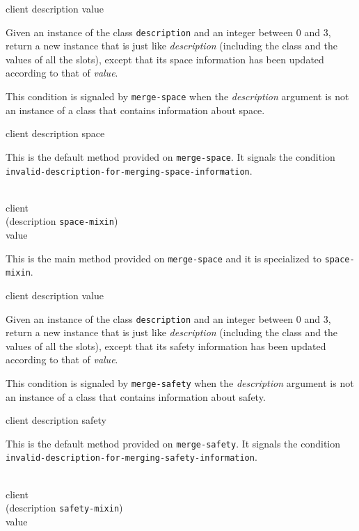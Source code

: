 {\footnotesize
{} {client description value}
}

Given an instance of the class \texttt{description} and an
integer between $0$ and $3$, return a new instance that is just like
\textit{description} (including the class and the values of
all the slots), except that its space information has been updated
according to that of \textit{value}.

{\footnotesize
{}
}

This condition is signaled by \texttt{merge-space} when the
\textit{description} argument is not an instance of a class that
contains information about space.

{\footnotesize
{} {client description space}
}

This is the default method provided on \texttt{merge-space}.  It
signals the condition
\texttt{invalid-description-for-merging-space-information}.

{\footnotesize
{}\\
           {client\\
            (description {\tt space-mixin})\\
            value}
}

This is the main method provided on \texttt{merge-space} and it is
specialized to \texttt{space-mixin}.

{\footnotesize
{} {client description value}
}

Given an instance of the class \texttt{description} and an
integer between $0$ and $3$, return a new instance that is just like
\textit{description} (including the class and the values of
all the slots), except that its safety information has been updated
according to that of \textit{value}.

{\footnotesize
{}
}

This condition is signaled by \texttt{merge-safety} when the
\textit{description} argument is not an instance of a class that
contains information about safety.

{\footnotesize
{} {client description safety}
}

This is the default method provided on \texttt{merge-safety}.  It
signals the condition
\texttt{invalid-description-for-merging-safety-information}.

{\footnotesize
{}\\
           {client\\
            (description {\tt safety-mixin})\\
            value}
}

